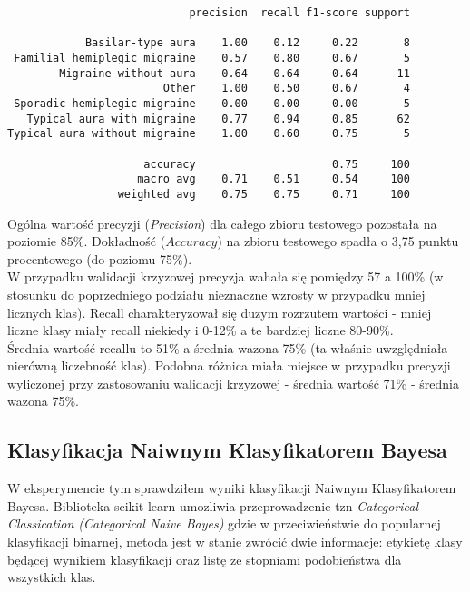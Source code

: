 \begin{verbatim}
                            precision  recall f1-score support

            Basilar-type aura    1.00    0.12     0.22       8
 Familial hemiplegic migraine    0.57    0.80     0.67       5
        Migraine without aura    0.64    0.64     0.64      11
                        Other    1.00    0.50     0.67       4
 Sporadic hemiplegic migraine    0.00    0.00     0.00       5
   Typical aura with migraine    0.77    0.94     0.85      62
Typical aura without migraine    1.00    0.60     0.75       5

                     accuracy                     0.75     100
                    macro avg    0.71    0.51     0.54     100
                 weighted avg    0.75    0.75     0.71     100
\end{verbatim}

Ogólna wartość precyzji (\textit{Precision}) dla całego zbioru testowego pozostała na poziomie 85\%. Dokładność ($Accuracy$) na zbioru testowego spadła o 3,75 punktu procentowego (do poziomu 75\%).\\

W przypadku walidacji krzyzowej precyzja wahała się pomiędzy 57 a 100\% (w stosunku do poprzedniego podziału nieznaczne wzrosty w przypadku mniej licznych klas). Recall charakteryzował się duzym rozrzutem wartości - mniej liczne klasy miały recall niekiedy i 0-12\% a te bardziej liczne 80-90\%.\\

Średnia wartość recallu to 51\% a średnia wazona 75\% (ta właśnie uwzględniała nierówną liczebność klas). Podobna różnica miała miejsce w przypadku precyzji wyliczonej przy zastosowaniu walidacji krzyzowej - średnia wartość 71\% - średnia wazona 75\%.\\

\subsection{Klasyfikacja Naiwnym Klasyfikatorem Bayesa}
W eksperymencie tym sprawdziłem wyniki klasyfikacji Naiwnym Klasyfikatorem Bayesa. Biblioteka scikit-learn umozliwia przeprowadzenie tzn \textit{Categorical Classication (Categorical Naive Bayes)} gdzie w przeciwieństwie do popularnej klasyfikacji binarnej, metoda jest w stanie zwrócić dwie informacje: etykietę klasy będącej wynikiem klasyfikacji oraz listę ze stopniami podobieństwa dla wszystkich klas.\\

